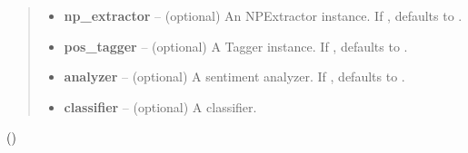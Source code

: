 \documentclass[letterpaper,10pt,english]{sphinxmanual}
\begin{document}
\begin{fulllineitems}
\begin{quote}
\begin{description}
\begin{itemize}
\item {} 
\textbf{np\_extractor} -- (optional) An NPExtractor instance. If ,
defaults to {\hyperref[api_reference:textblob_de.np_extractors.PatternParserNPExtractor]{}}.

\item {} 
\textbf{pos\_tagger} -- (optional) A Tagger instance. If , defaults to
{\hyperref[api_reference:textblob_de.taggers.PatternTagger]{}}.

\item {} 
\textbf{analyzer} -- (optional) A sentiment analyzer. If , defaults to
{\hyperref[api_reference:textblob_de.sentiments.PatternAnalyzer]{}}.

\item {} 
\textbf{classifier} -- (optional) A classifier.

\end{itemize}

\end{description}\end{quote}

()

\end{fulllineitems}

\end{document}
